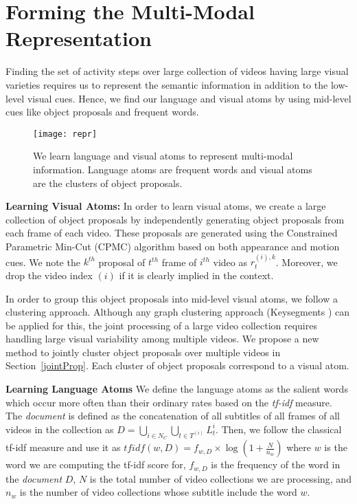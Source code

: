 \section{Forming the Multi-Modal Representation}
\label{atoms}
Finding the set of activity steps over large collection of videos having large visual varieties requires us to represent the semantic information in addition to the low-level visual cues. Hence, we find our language and visual atoms by using mid-level cues like object proposals and frequent words.

\begin{figure}[h]
  \texttt{[image: repr]}
  \vspace{-8mm}
  \caption{We learn language and visual atoms to represent multi-modal information. Language atoms are frequent words and visual atoms are the clusters of object proposals.}
  \vspace{-3mm}
\label{fig:overview}
\end{figure}

\noindent\textbf{Learning Visual Atoms:} In order to learn visual atoms, we create a large collection of object proposals by independently generating object proposals from each frame of each video. These proposals are generated using the Constrained Parametric Min-Cut (CPMC) \cite{cpmc} algorithm based on both appearance and motion cues. We note the $k^{th}$ proposal of $t^{th}$ frame of $i^{th}$ video as $r^{(i),k}_t$. Moreover, we drop the video index $(i)$ if it is clearly implied in the context.

In order to group this object proposals into mid-level visual atoms, we follow a clustering approach. Although any graph clustering approach (\eg Keysegments \cite{keysegments}) can be applied for this, the joint processing of a large video collection requires handling large visual variability among multiple videos. We propose a new method to jointly cluster object proposals over multiple videos in Section~\ref{jointProp}. Each cluster of object proposals correspond to a visual atom.

\noindent\textbf{Learning Language Atoms}
We define the language atoms as the salient words which occur more often than their ordinary rates based on the \emph{tf-idf} measure. The \emph{document} is defined as the concatenation of all subtitles of all frames of all videos in the collection as $D=\bigcup_{i \in N_C} \bigcup_{t \in T^{(i)}} L_t^i$. Then, we follow the classical tf-idf measure and use it as $tfidf(w,D)=f_{w,D} \times \log \left( 1+ \frac{N}{n_{w}}\right)$ where $w$ is the word we are computing the tf-idf score for, $f_{w,D}$ is the frequency of the word in the \emph{document} $D$, $N$ is the total number of video collections we are processing, and $n_{w}$ is the number of video collections whose subtitle include the word $w$.

